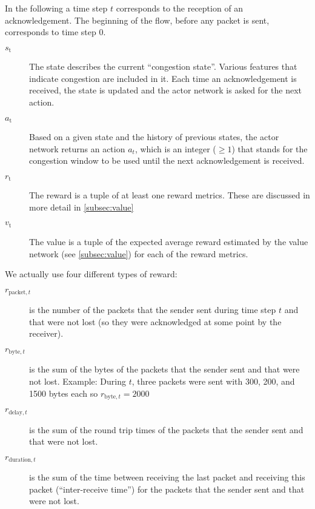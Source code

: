 \documentclass[sigconf]{acmart}
\begin{document}
In the following a time step $t$ corresponds to the reception of an acknowledgement. The beginning of the flow, before any packet is sent, corresponds to time step $0$.

\begin{description}
\item[$\textit{s}_\text{t}$] The state  describes the current ``congestion state''. Various features that indicate congestion are included in it. Each time an acknowledgement is received, the state is updated and the actor network is asked for the next action. 
\item[$\textit{a}_\text{t}$] Based on a given state and the history of previous states, the actor network returns an action $a_t$, which is an integer ($\geq 1$) that stands for the congestion window to be used until the next acknowledgement is received. 
\item[$\textit{r}_\text{t}$] The reward is a tuple of at least one reward metrics. These are discussed in more detail in \autoref{subsec:value}
\item[$\textit{v}_\text{t}$] The value is a tuple of the expected average reward estimated by the value network (see \autoref{subsec:value}) for each of the reward metrics. 
\end{description}

We actually use four different types of reward: 
\begin{description}
\item[$\textit{r}_{\text{packet},t}$] is the number of the packets that the sender sent during time step $t$ and that were not lost (so they were acknowledged at some point by the receiver).
\item[$\textit{r}_{\text{byte},t}$] is the sum of the bytes of the packets that the sender sent and that were not lost. Example: During $t$, three packets were sent with 300, 200, and 1500 bytes each so $\textit{r}_{\text{byte},t} = 2000$
\item[$\textit{r}_{\text{delay},t}$] is the sum of the round trip times of the packets that the sender sent and that were not lost.
\item[$\textit{r}_{\text{duration},t}$] is the sum of the time between receiving the last packet and receiving this packet (``inter-receive time'') for the packets that the sender sent and that were not lost.
\end{description}
\end{document}
